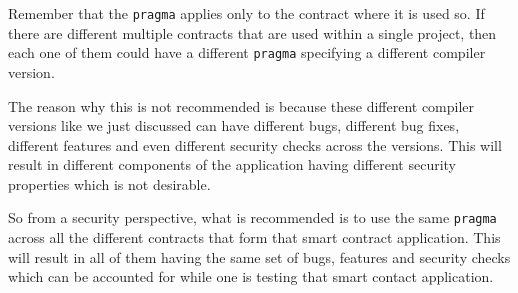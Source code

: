 Remember that the \texttt{pragma} applies only to the contract where it
is used so. If there are different multiple contracts that are used
within a single project, then each one of them could have a different
\texttt{pragma} specifying a different compiler version.

The reason why this is not recommended is because these different
compiler versions like we just discussed can have different bugs,
different bug fixes, different features and even different security
checks across the versions. This will result in different components of
the application having different security properties which is not
desirable.

So from a security perspective, what is recommended is to use the same
\texttt{pragma} across all the different contracts that form that smart
contract application. This will result in all of them having the same
set of bugs, features and security checks which can be accounted for
while one is testing that smart contact application.
